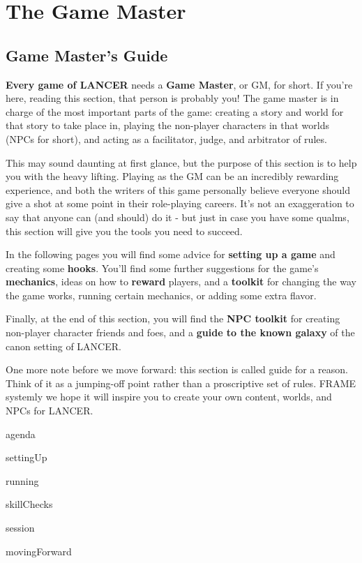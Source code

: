 \chapter{The Game Master}

\section{
Game Master's Guide
}

\textbf{Every game of LANCER} needs a \textbf{Game Master}, or GM, for short. If you're here, reading this
section, that person is probably you! The game master is in charge of the most important parts of
the game: creating a story and world for that story to take place in, playing the non-player
characters in that worlds (NPCs for short), and acting as a facilitator, judge, and arbitrator of
rules.

This may sound daunting at first glance, but the purpose of this section is to help you with the
heavy lifting. Playing as the GM can be an incredibly rewarding experience, and both the writers
of this game personally believe everyone should give a shot at some point in their role-playing
careers. It's not an exaggeration to say that anyone can (and should) do it - but just in case you
have some qualms, this section will give you the tools you need to succeed.

In the following pages you will find some advice for \textbf{setting up a game} and creating some
\textbf{hooks}. You'll find some further suggestions for the game's \textbf{mechanics}, ideas on how to \textbf{reward}
players, and a \textbf{toolkit} for changing the way the game works, running certain mechanics, or
adding some extra flavor.

Finally, at the end of this section, you will find the \textbf{NPC toolkit} for creating non-player character
friends and foes, and a \textbf{guide to the known galaxy} of the canon setting of LANCER.

One more note before we move forward: this section is called guide for a reason. Think of it as a
jumping-off point rather than a proscriptive set of rules. FRAME systemly we hope it will inspire
you to create your own content, worlds, and NPCs for LANCER.


{agenda}

{settingUp}

{running}

{skillChecks}

{session}

{movingForward}





